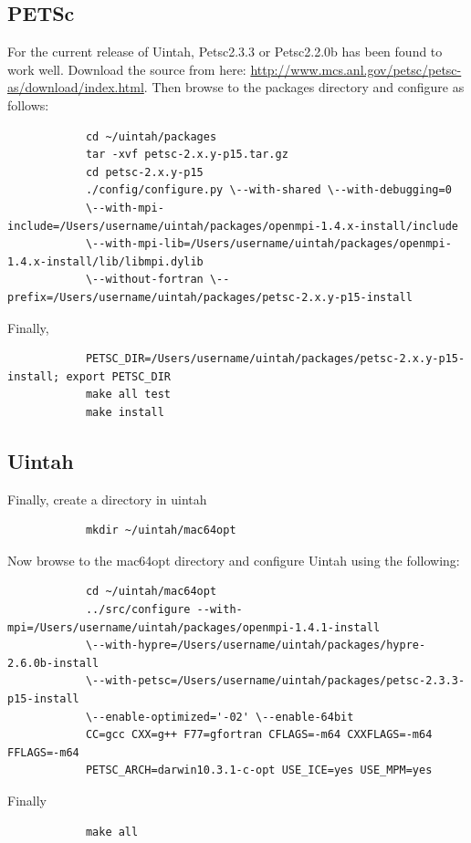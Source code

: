 \documentclass[12pt]{article}
\begin{document}
		\subsection{PETSc}
		For the current release of Uintah, Petsc2.3.3 or Petsc2.2.0b has been found to work well. Download the source from here: \url{http://www.mcs.anl.gov/petsc/petsc-as/download/index.html}.
		Then browse to the packages directory and configure as follows:
		{\small
		\begin{verbatim}
			cd ~/uintah/packages
			tar -xvf petsc-2.x.y-p15.tar.gz
			cd petsc-2.x.y-p15
			./config/configure.py \--with-shared \--with-debugging=0 
			\--with-mpi-include=/Users/username/uintah/packages/openmpi-1.4.x-install/include 
			\--with-mpi-lib=/Users/username/uintah/packages/openmpi-1.4.x-install/lib/libmpi.dylib 
			\--without-fortran \--prefix=/Users/username/uintah/packages/petsc-2.x.y-p15-install
		\end{verbatim}}
		Finally,
		{\small
		\begin{verbatim}
			PETSC_DIR=/Users/username/uintah/packages/petsc-2.x.y-p15-install; export PETSC_DIR
			make all test
			make install
		\end{verbatim}}
		
		\subsection{Uintah}
		Finally, create a directory in uintah
		{\small 
		\begin{verbatim}
			mkdir ~/uintah/mac64opt
		\end{verbatim}} %
		\noindent Now browse to the mac64opt directory and configure Uintah using the following:
		{\small
		\begin{verbatim}
			cd ~/uintah/mac64opt
			../src/configure --with-mpi=/Users/username/uintah/packages/openmpi-1.4.1-install 
			\--with-hypre=/Users/username/uintah/packages/hypre-2.6.0b-install 
			\--with-petsc=/Users/username/uintah/packages/petsc-2.3.3-p15-install 
			\--enable-optimized='-02' \--enable-64bit 
			CC=gcc CXX=g++ F77=gfortran CFLAGS=-m64 CXXFLAGS=-m64 FFLAGS=-m64
			PETSC_ARCH=darwin10.3.1-c-opt USE_ICE=yes USE_MPM=yes
		\end{verbatim}} %
		\noindent Finally
		{\small
		\begin{verbatim}
			make all
		\end{verbatim}}
\end{document}
